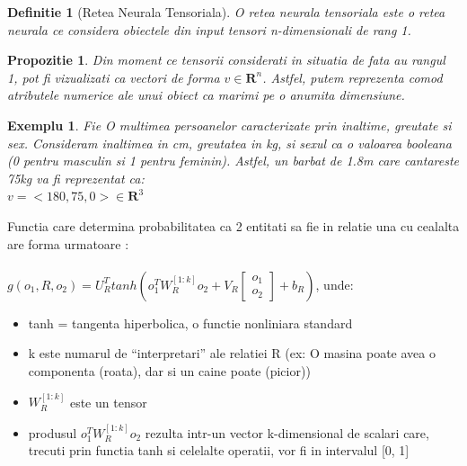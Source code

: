 \documentclass{article}
\newtheorem{definition}{Definitie}[section]
\newtheorem{prop}{Propozitie}[section]
\newtheorem{example}{Exemplu}[section]
\begin{document}
\begin{definition}[Retea Neurala Tensoriala]
O retea neurala tensoriala este o retea neurala ce considera obiectele din input tensori n-dimensionali de rang 1. 
\end{definition}

\begin{prop}
Din moment ce tensorii considerati in situatia de fata au rangul 1, pot fi vizualizati ca vectori de forma $v \in \mathbf{R}^n$. Astfel, putem reprezenta comod atributele numerice ale unui obiect ca marimi pe o anumita dimensiune.
\end{prop}

\begin{example}
Fie O multimea persoanelor caracterizate prin inaltime, greutate si sex. Consideram inaltimea in cm, greutatea in kg, si sexul ca o valoarea booleana (0 pentru masculin si 1 pentru feminin). Astfel, un barbat de 1.8m care cantareste 75kg va fi reprezentat ca:\\
$v = <180, 75, 0> \in \mathbf{R}^3$
\end{example}

Functia care determina probabilitatea ca 2 entitati sa fie in relatie una cu cealalta are forma urmatoare \cite{NTN}: \\ \\
$g(o_1, R, o_2) = U_R^T tanh(o_1^T W_R^{[1:k]}o_2 + V_R \left[\begin{smallmatrix} o_1 \\ o_2 \end{smallmatrix}\right] + b_R)$, unde:\\
\begin{itemize}
	\item tanh = tangenta hiperbolica, o functie nonliniara standard
	\item k este numarul de ``interpretari'' ale relatiei R (ex: O masina poate avea o componenta (roata), dar si un caine poate (picior))
	\item $W_R^{[1:k]}$ este un tensor
	\item produsul $o_1^T W_R^{[1:k]}o_2$ rezulta intr-un vector k-dimensional de scalari care, trecuti prin functia tanh si celelalte operatii, vor fi in intervalul [0, 1]
\end{itemize}
\end{document}
